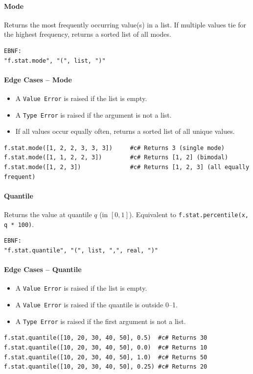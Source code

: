 \paragraph{Mode}
Returns the most frequently occurring value(s) in a list. If multiple values tie for the highest frequency, returns a sorted list of all modes.
\begin{verbatim}
EBNF:
"f.stat.mode", "(", list, ")"
\end{verbatim}

\paragraph{Edge Cases -- Mode}
\begin{itemize}
\item A \texttt{Value Error} is raised if the list is empty.
\item A \texttt{Type Error} is raised if the argument is not a list.
\item If all values occur equally often, returns a sorted list of all unique values.
\end{itemize}
\begin{verbatim}
f.stat.mode([1, 2, 2, 3, 3, 3])     #c# Returns 3 (single mode)
f.stat.mode([1, 1, 2, 2, 3])        #c# Returns [1, 2] (bimodal)
f.stat.mode([1, 2, 3])              #c# Returns [1, 2, 3] (all equally frequent)
\end{verbatim}

\paragraph{Quantile}
Returns the value at quantile $q$ (in $[0, 1]$). Equivalent to \texttt{f.stat.percentile(x, q * 100)}.
\begin{verbatim}
EBNF:
"f.stat.quantile", "(", list, ",", real, ")"
\end{verbatim}

\paragraph{Edge Cases -- Quantile}
\begin{itemize}
\item A \texttt{Value Error} is raised if the list is empty.
\item A \texttt{Value Error} is raised if the quantile is outside 0--1.
\item A \texttt{Type Error} is raised if the first argument is not a list.
\end{itemize}
\begin{verbatim}
f.stat.quantile([10, 20, 30, 40, 50], 0.5)  #c# Returns 30
f.stat.quantile([10, 20, 30, 40, 50], 0.0)  #c# Returns 10
f.stat.quantile([10, 20, 30, 40, 50], 1.0)  #c# Returns 50
f.stat.quantile([10, 20, 30, 40, 50], 0.25) #c# Returns 20
\end{verbatim}

